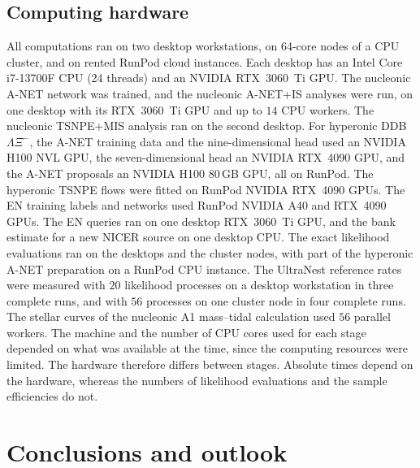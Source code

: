 \documentclass[aps,prd,twocolumn,superscriptaddress,nofootinbib,longbibliography]{revtex4-2}
\begin{document}
\subsection{Computing hardware}
\label{sec:results:hardware}
All computations ran on two desktop workstations, on 64-core nodes of a CPU
cluster, and on rented RunPod cloud instances. Each desktop has an Intel Core
i7-13700F CPU (24 threads) and an NVIDIA RTX~3060~Ti GPU. The nucleonic A-NET
network was trained, and the nucleonic A-NET+IS analyses were run, on one desktop
with its RTX~3060~Ti GPU and up to $14$ CPU workers. The nucleonic TSNPE+MIS
analysis ran on the second desktop. For hyperonic DDB$\Lambda\Xi^-$, the A-NET
training data and the nine-dimensional head used an NVIDIA H100 NVL GPU, the
seven-dimensional head an NVIDIA RTX~4090 GPU, and the A-NET proposals an NVIDIA
H100 80\,GB GPU, all on RunPod. The hyperonic TSNPE flows were fitted on RunPod NVIDIA
RTX~4090 GPUs. The EN training labels and networks used RunPod NVIDIA A40 and
RTX~4090 GPUs. The EN queries ran on one desktop RTX~3060~Ti GPU, and the bank
estimate for a new NICER source on one desktop CPU. The exact likelihood
evaluations ran on the desktops and the cluster nodes, with part of the hyperonic
A-NET preparation on a RunPod CPU instance. The UltraNest reference rates were
measured with $20$ likelihood processes on a desktop workstation in three complete
runs, and with $56$ processes on one cluster node in four complete runs. The
stellar curves of the nucleonic A1 mass--tidal calculation used $56$ parallel
workers. The machine and the number of CPU cores used for each stage depended on
what was available at the time, since the computing resources were limited. The
hardware therefore differs between stages. Absolute times depend on the hardware,
whereas the numbers of likelihood evaluations and the sample efficiencies do not.

\flushbottom

\section{Conclusions and outlook}
\label{sec:conclusions}
\end{document}
